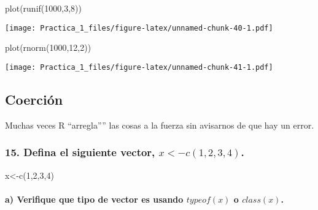\documentclass[
]{article}
\newenvironment{Shaded}{\begin{snugshade}}{\end{snugshade}}
\newcommand{\DecValTok}[1]{\textcolor[rgb]{0.00,0.00,0.81}{#1}}
\newcommand{\FunctionTok}[1]{\textcolor[rgb]{0.00,0.00,0.00}{#1}}
\newcommand{\NormalTok}[1]{#1}
\newcommand{\OtherTok}[1]{\textcolor[rgb]{0.56,0.35,0.01}{#1}}
\begin{document}
\begin{Shaded}
\begin{Highlighting}[]
\FunctionTok{plot}\NormalTok{(}\FunctionTok{runif}\NormalTok{(}\DecValTok{1000}\NormalTok{,}\DecValTok{3}\NormalTok{,}\DecValTok{8}\NormalTok{))}
\end{Highlighting}
\end{Shaded}

\texttt{[image: Practica\_1\_files/figure-latex/unnamed-chunk-40-1.pdf]}

\begin{Shaded}
\begin{Highlighting}[]
\FunctionTok{plot}\NormalTok{(}\FunctionTok{rnorm}\NormalTok{(}\DecValTok{1000}\NormalTok{,}\DecValTok{12}\NormalTok{,}\DecValTok{2}\NormalTok{))}
\end{Highlighting}
\end{Shaded}

\texttt{[image: Practica\_1\_files/figure-latex/unnamed-chunk-41-1.pdf]}

\hypertarget{coerciuxf3n}{%
\subsection{Coerción}\label{coerciuxf3n}}

Muchas veces R ``arregla'''' las cosas a la fuerza sin avisarnos de que
hay un error.

\hypertarget{defina-el-siguiente-vector-x-c1234.}{%
\subsubsection{\texorpdfstring{15. Defina el siguiente vector,
\(x<-c(1,2,3,4)\).}{15. Defina el siguiente vector, x\textless-c(1,2,3,4).}}\label{defina-el-siguiente-vector-x-c1234.}}

\begin{Shaded}
\begin{Highlighting}[]
\NormalTok{x}\OtherTok{\textless{}{-}}\FunctionTok{c}\NormalTok{(}\DecValTok{1}\NormalTok{,}\DecValTok{2}\NormalTok{,}\DecValTok{3}\NormalTok{,}\DecValTok{4}\NormalTok{)}
\end{Highlighting}
\end{Shaded}

\hypertarget{a-verifique-que-tipo-de-vector-es-usando-typeofx-o-classx.}{%
\paragraph{\texorpdfstring{a) Verifique que tipo de vector es usando
\(typeof(x)\) o
\(class(x)\).}{a) Verifique que tipo de vector es usando typeof(x) o class(x).}}\label{a-verifique-que-tipo-de-vector-es-usando-typeofx-o-classx.}}
\end{document}
